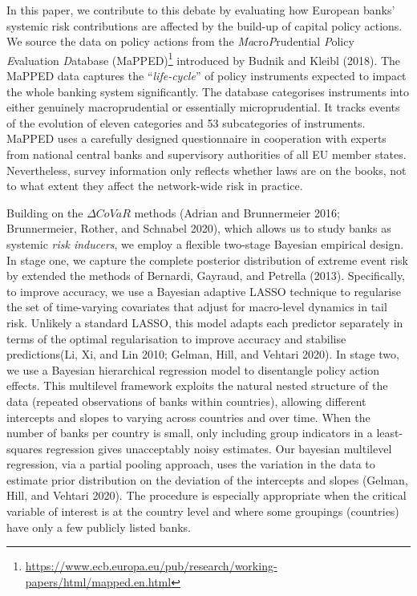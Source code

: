 \documentclass[
  10pt,
]{article}
\begin{document}
In this paper, we contribute to this debate by evaluating how European
banks' systemic risk contributions are affected by the build-up of
capital policy actions. We source the data on policy actions from the
\emph{Ma}cro\emph{P}rudential \emph{P}olicy \emph{E}valuation
\emph{D}atabase (MaPPED)\footnote{\url{https://www.ecb.europa.eu/pub/research/working-papers/html/mapped.en.html}}
introduced by Budnik and Kleibl (2018). The MaPPED data captures the
``\emph{life-cycle}'' of policy instruments expected to impact the whole
banking system significantly. The database categorises instruments into
either genuinely macroprudential or essentially microprudential. It
tracks events of the evolution of eleven categories and 53 subcategories
of instruments. MaPPED uses a carefully designed questionnaire in
cooperation with experts from national central banks and supervisory
authorities of all EU member states. Nevertheless, survey information
only reflects whether laws are on the books, not to what extent they
affect the network-wide risk in practice.

Building on the \(\Delta CoVaR\) methods (Adrian and Brunnermeier 2016;
Brunnermeier, Rother, and Schnabel 2020), which allows us to study banks
as systemic \emph{risk inducers}, we employ a flexible two-stage
Bayesian empirical design. In stage one, we capture the complete
posterior distribution of extreme event risk by extended the methods of
Bernardi, Gayraud, and Petrella (2013). Specifically, to improve
accuracy, we use a Bayesian adaptive LASSO technique to regularise the
set of time-varying covariates that adjust for macro-level dynamics in
tail risk. Unlikely a standard LASSO, this model adapts each predictor
separately in terms of the optimal regularisation to improve accuracy
and stabilise predictions(Li, Xi, and Lin 2010; Gelman, Hill, and
Vehtari 2020). In stage two, we use a Bayesian hierarchical regression
model to disentangle policy action effects. This multilevel framework
exploits the natural nested structure of the data (repeated observations
of banks within countries), allowing different intercepts and slopes to
varying across countries and over time. When the number of banks per
country is small, only including group indicators in a least-squares
regression gives unacceptably noisy estimates. Our bayesian multilevel
regression, via a partial pooling approach, uses the variation in the
data to estimate prior distribution on the deviation of the intercepts
and slopes (Gelman, Hill, and Vehtari 2020). The procedure is especially
appropriate when the critical variable of interest is at the country
level and where some groupings (countries) have only a few publicly
listed banks.
\end{document}
